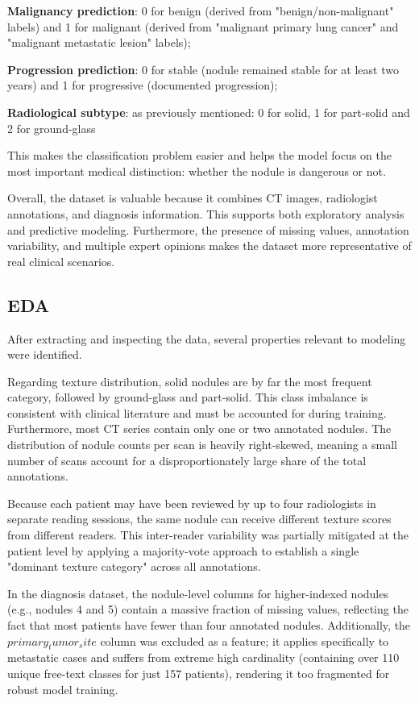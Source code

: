 \textbf{Malignancy prediction}: 0 for benign (derived from "benign/non-malignant" labels) and 1 for malignant (derived from "malignant primary lung cancer" and "malignant metastatic lesion" labels);

\textbf{Progression prediction}: 0 for stable (nodule remained stable for at least two years) and 1 for progressive (documented progression);

\textbf{Radiological subtype}: as previously mentioned: 0 for solid, 1 for part-solid and 2 for ground-glass

This makes the classification problem easier and helps the model focus on the most important medical distinction: whether the nodule is dangerous or not.

Overall, the dataset is valuable because it combines CT images, radiologist annotations, and diagnosis information. This supports both exploratory analysis and predictive modeling. Furthermore, the presence of missing values, annotation variability, and multiple expert opinions makes the dataset more representative of real clinical scenarios.

\subsection{EDA}

After extracting and inspecting the data, several properties relevant to modeling were identified.

Regarding texture distribution, solid nodules are by far the most frequent category, followed by ground-glass and part-solid. This class imbalance is consistent with clinical literature and must be accounted for during training. Furthermore, most CT series contain only one or two annotated nodules. The distribution of nodule counts per scan is heavily right-skewed, meaning a small number of scans account for a disproportionately large share of the total annotations.

Because each patient may have been reviewed by up to four radiologists in separate reading sessions, the same nodule can receive different texture scores from different readers. This inter-reader variability was partially mitigated at the patient level by applying a majority-vote approach to establish a single "dominant texture category" across all annotations.

In the diagnosis dataset, the nodule-level columns for higher-indexed nodules (e.g., nodules 4 and 5) contain a massive fraction of missing values, reflecting the fact that most patients have fewer than four annotated nodules. Additionally, the $primary_tumor_site$ column was excluded as a feature; it applies specifically to metastatic cases and suffers from extreme high cardinality (containing over 110 unique free-text classes for just 157 patients), rendering it too fragmented for robust model training.

